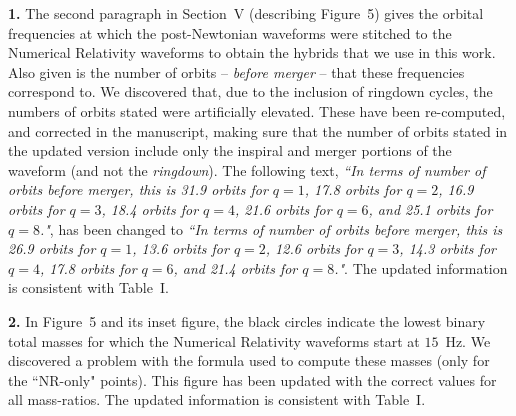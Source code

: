 \documentclass[a4paper,12pt]{article}
\begin{document}
{\bf 1.}
The second paragraph in Section~V (describing Figure~5)
gives the orbital frequencies 
at which the post-Newtonian waveforms were stitched to the Numerical 
Relativity waveforms to obtain the hybrids that we use in this work. 
Also given is the number of orbits -- {\it before merger} -- that these 
frequencies correspond to. We discovered that, due to the inclusion of 
ringdown cycles, the numbers of orbits stated were
artificially elevated. These have been re-computed, and corrected in
the manuscript, making sure that the number of orbits stated in the 
updated version 
include only the inspiral and merger portions of the waveform
(and not the {\it ringdown}).
The following text, {\it ``In terms of number of orbits before merger,
this is 31.9 orbits for $q=1$, 17.8 orbits for $q=2$,
16.9 orbits for $q=3$, 18.4 orbits for $q=4$, 21.6 orbits for $q=6$,
and 25.1 orbits for $q=8$."}, has been changed to {\it ``In terms of
number of orbits before merger, this is 26.9 orbits for $q=1$, 13.6 
orbits for $q=2$, 12.6 orbits for $q=3$, 14.3 orbits for $q=4$, 
17.8 orbits for $q=6$, and 21.4 orbits for $q=8$."}. The updated 
information is consistent with Table~I.
\vspace{8pt}

{\bf 2.}
In Figure~5 and its inset figure, the black circles indicate the 
lowest binary total masses for which the Numerical Relativity
waveforms start at $15$~Hz. We discovered a problem with the formula
used to compute these masses (only for the ``NR-only" points). 
This figure has been updated with the correct values for all 
mass-ratios. The updated information is consistent with Table~I.


\end{document}
